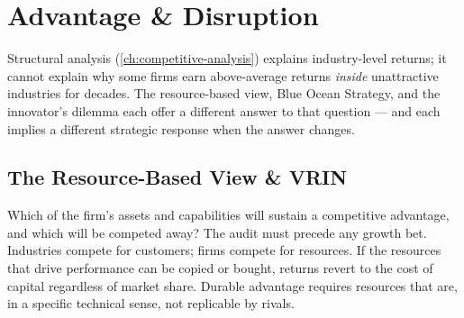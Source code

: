 \chapter{Advantage \& Disruption}\label{ch:advantage-and-disruption}


Structural analysis (\cref{ch:competitive-analysis}) explains industry-level returns;
it cannot explain why some firms earn above-average returns \emph{inside} unattractive
industries for decades. The resource-based view, Blue Ocean Strategy, and the innovator's
dilemma each offer a different answer to that question --- and each implies a different
strategic response when the answer changes.

\section{The Resource-Based View \& VRIN}\label{sec:rbv-vrin}

Which of the firm's assets and capabilities will sustain a competitive advantage, and
which will be competed away? The audit must precede any growth bet. Industries compete for
customers; firms compete for resources. If the resources that drive performance can be
copied or bought, returns revert to the cost of capital regardless of market share. Durable
advantage requires resources that are, in a specific technical sense, not replicable by
rivals.

